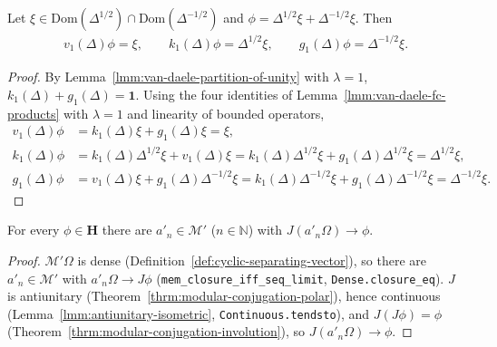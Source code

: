\begin{lemma}
    \label{lmm:van-daele-inversion}
    \leanok
    Let $\xi \in \text{Dom}(\Delta^{1/2}) \cap \text{Dom}(\Delta^{-1/2})$ and $\phi = \Delta^{1/2}\xi + \Delta^{-1/2}\xi$. Then
    \begin{align}
        v_1(\Delta)\phi = \xi, \qquad k_1(\Delta)\phi = \Delta^{1/2}\xi, \qquad g_1(\Delta)\phi = \Delta^{-1/2}\xi.
    \end{align}
\end{lemma}
\begin{proof}
    \leanok
    By Lemma~\ref{lmm:van-daele-partition-of-unity} with $\lambda = 1$, $k_1(\Delta) + g_1(\Delta) = \mathbf{1}$. Using the four identities of Lemma~\ref{lmm:van-daele-fc-products} with $\lambda = 1$ and linearity of bounded operators,
    \begin{align}
        v_1(\Delta)\phi &= k_1(\Delta)\xi + g_1(\Delta)\xi = \xi, \\
        k_1(\Delta)\phi &= k_1(\Delta)\Delta^{1/2}\xi + v_1(\Delta)\xi = k_1(\Delta)\Delta^{1/2}\xi + g_1(\Delta)\Delta^{1/2}\xi = \Delta^{1/2}\xi, \\
        g_1(\Delta)\phi &= v_1(\Delta)\xi + g_1(\Delta)\Delta^{-1/2}\xi = k_1(\Delta)\Delta^{-1/2}\xi + g_1(\Delta)\Delta^{-1/2}\xi = \Delta^{-1/2}\xi.
    \end{align}
\end{proof}

\begin{lemma}
    \label{lmm:modular-conjugation-commutant-dense}
    \leanok
    For every $\phi \in \mathbf{H}$ there are $a'_n \in \mathcal{M}'$ ($n \in \mathbb{N}$) with $J(a'_n\Omega) \to \phi$.
\end{lemma}
\begin{proof}
    \leanok
    $\mathcal{M}'\Omega$ is dense (Definition~\ref{def:cyclic-separating-vector}), so there are $a'_n \in \mathcal{M}'$ with $a'_n\Omega \to J\phi$ (\texttt{mem\_closure\_iff\_seq\_limit}, \texttt{Dense.closure\_eq}). $J$ is antiunitary (Theorem~\ref{thrm:modular-conjugation-polar}), hence continuous (Lemma~\ref{lmm:antiunitary-isometric}, \texttt{Continuous.tendsto}), and $J(J\phi) = \phi$ (Theorem~\ref{thrm:modular-conjugation-involution}), so $J(a'_n\Omega) \to \phi$.
\end{proof}

